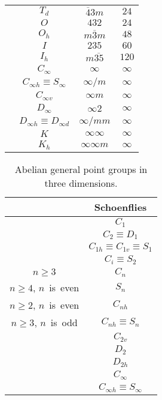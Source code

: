 \begin{table}[tb]
\begin{tabular}{cccc}
    & $T_{d}$ & $\overline{4}3m$ & $24$ \\
    & $O$     & $432$            & $24$ \\
    & $O_{h}$ & $m\overline{3}m$ & $48$ \\
    & $I$     & $235$            & $60$ \\
    & $I_{h}$ & $m\overline{35}$ & $120$ \\
    \hline
    & $C_{\infty}$                       & $\infty$          & $\infty$ \\
    & $C_{\infty h} \equiv S_{\infty}$   & $\infty / m$      & $\infty$ \\
    & $C_{\infty v}$                     & $\infty m$        & $\infty$ \\
    & $D_{\infty}$                       & $\infty 2$        & $\infty$ \\
    & $D_{\infty h} \equiv D_{\infty d}$ & $\infty / mm$     & $\infty$\\
    & $K$                                & $\infty \infty$   & $\infty$\\
    & $K_{h}$                            & $\infty \infty m$ & $\infty$\\
    \hline \hline
  \end{tabular}
\end{table}

\begin{table}[tb]
  \centering
  \caption{
    \todo{}
    Abelian general point groups in three dimensions.
  }
  \label{tab:abelian_point_groups}
  \begin{tabular}{cc}
    \hline \hline
    & Schoenflies \\
    \hline
    & $C_{1}$                             \\
    & $C_{2} \equiv D_{1}$                \\
    & $C_{1h} \equiv C_{1v} \equiv S_{1}$ \\
    & $C_{i} \equiv S_{2}$                \\
    \hline
    $n \geq 3$                     & $C_{n}$               \\
    $n \geq 4$, \mbox{$n$ is even} & $S_{n}$               \\
    $n \geq 2$, \mbox{$n$ is even} & $C_{nh}$              \\
    $n \geq 3$, \mbox{$n$ is odd}  & $C_{nh} \equiv S_{n}$ \\
                                   & $C_{2v}$              \\
    \hline
    & $D_{2}$  \\
    & $D_{2h}$ \\
    \hline
    & $C_{\infty}$                     \\
    & $C_{\infty h} \equiv S_{\infty}$ \\
    \hline \hline
  \end{tabular}
\end{table}

